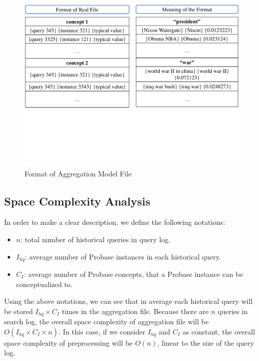 \begin{figure}[h]
\centering
\includegraphics[scale=0.3]{images/aggregation}
\caption{Format of Aggregation Model File}
\label{fig:aggregation}
\end{figure} 

\subsection{Space Complexity Analysis}
\label{sec:spaceAnalysis}
In order to make a clear description, we define the following notations:

\begin{itemize}
  \item $n$: total number of historical queries in query log.
  \item $I_{hq}$: average number of Probase instances in each historical query.
  \item $C_I$: average number of Probase concepts, that a Probase instance can be conceptualized to.
\end{itemize}

Using the above notations, we can see that in average each historical query will be stored $I_{hq} \times C_I$ times in the aggregation file. Because there are $n$ queries in search log, the overall space complexity of aggregation file will be $O(I_{hq} \times C_I \times n)$. In this case, if we consider $I_{hq}$ and $C_I$ as constant, the overall space complexity of preprocessing will be $O(n)$, linear to the size of the query log.
